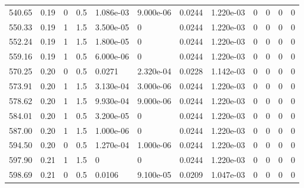 \documentclass[preview]{standalone}
\begin{document}
{{{{\begin{tabular}{L{1.2cm}C{1.2cm} C{0.3cm}C{0.5cm} C{1.4cm}C{1.4cm} C{1.4cm}C{1.4cm} C{1.6cm}C{1.6cm} C{1.6cm}C{1.6cm}}
  540.65  &  0.19  & 0     & 0.5 &  1.086e-03  & 9.000e-06  &  0.0244&   1.220e-03& 0 & 0   &  0 & 0  \\ 
  550.33  &  0.19  & 1     & 1.5 &  3.500e-05  & 0  &  0.0244&   1.220e-03& 0 & 0   &  0 & 0  \\ 
  552.24  &  0.19  & 1     & 1.5 &  1.800e-05  & 0  &  0.0244&   1.220e-03& 0 & 0   &  0 & 0  \\ 
  559.16  &  0.19  & 1     & 0.5 &  6.000e-06  & 0  &  0.0244&   1.220e-03& 0 & 0   &  0 & 0  \\ 
  570.25  &  0.20  & 0     & 0.5 &  0.0271  & 2.320e-04  &  0.0228&   1.142e-03& 0 & 0   &  0 & 0  \\ 
  573.91  &  0.20  & 1     & 1.5 &  3.130e-04  & 3.000e-06  &  0.0244&   1.220e-03& 0 & 0   &  0 & 0  \\ 
  578.62  &  0.20  & 1     & 1.5 &  9.930e-04  & 9.000e-06  &  0.0244&   1.220e-03& 0 & 0   &  0 & 0  \\ 
  584.01  &  0.20  & 1     & 0.5 &  3.200e-05  & 0  &  0.0244&   1.220e-03& 0 & 0   &  0 & 0  \\ 
  587.00  &  0.20  & 1     & 1.5 &  1.000e-06  & 0  &  0.0244&   1.220e-03& 0 & 0   &  0 & 0  \\ 
  594.50  &  0.20  & 0     & 0.5 &  1.270e-04  & 1.000e-06  &  0.0244&   1.220e-03& 0 & 0   &  0 & 0  \\ 
  597.90  &  0.21  & 1     & 1.5 &  0  & 0  &  0.0244&   1.220e-03& 0 & 0   &  0 & 0  \\ 
  598.69  &  0.21  & 0     & 0.5 &  0.0106  & 9.100e-05  &  0.0209&   1.047e-03& 0 & 0   &  0 & 0  \\ 
\hline 
\end{tabular} 

}}}}
\end{document}
